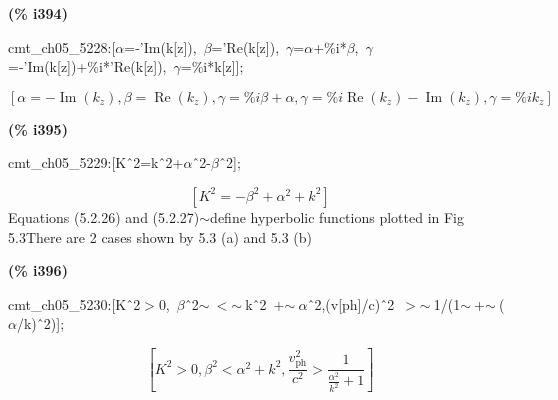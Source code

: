 \documentclass[fleqn]{article}
\begin{document}
\noindent
\begin{minipage}[t]{4.000000em}\color{red}\bfseries
(\% i394)	
\end{minipage}
\begin{minipage}[t]{\textwidth}\color{blue}
cmt\_ch05\_5228:[\ensuremath{\alpha}=-'Im(k[z]),\ \ensuremath{\beta}='Re(k[z]),\ \ensuremath{\gamma}=\ensuremath{\alpha}+\%i*\ensuremath{\beta},\ \ensuremath{\gamma}=-'Im(k[z])+\%i*'Re(k[z]),\ \ensuremath{\gamma}=\%i*k[z]];
\end{minipage}
\[\displaystyle \tag{\% o394} 
\left[ \alpha =-\operatorname{Im}\left( {k_z}\right) \operatorname{,}\beta =\operatorname{Re}\left( {k_z}\right) \operatorname{,}\gamma =\% i \beta +\alpha \operatorname{,}\gamma =\% i \operatorname{Re}\left( {k_z}\right) -\operatorname{Im}\left( {k_z}\right) \operatorname{,}\gamma =\% i {k_z}\right] \mbox{}
\]


\noindent
\begin{minipage}[t]{4.000000em}\color{red}\bfseries
(\% i395)	
\end{minipage}
\begin{minipage}[t]{\textwidth}\color{blue}
cmt\_ch05\_5229:[K\^\ 2=k\^\ 2+\ensuremath{\alpha}\^\ 2-\ensuremath{\beta}\^\ 2];
\end{minipage}
\[\displaystyle \tag{\% o395} 
\left[ {{K}^{2}}=-{{\beta }^{2}}+{{\alpha }^{2}}+{{k}^{2}}\right] \mbox{}
\]
Equations (5.2.26) and (5.2.27)\ensuremath{\sim }define hyperbolic functions plotted in Fig 5.3There are 2 cases shown by 5.3 (a) and 5.3 (b)


\noindent
\begin{minipage}[t]{4.000000em}\color{red}\bfseries
(\% i396)	
\end{minipage}
\begin{minipage}[t]{\textwidth}\color{blue}
cmt\_ch05\_5230:[K\^\ 2\ensuremath{>}0,\ \ensuremath{\beta}\^\ 2\ensuremath{\sim\ }\ensuremath{<}\ensuremath{\sim\ }k\^\ 2\ +\ensuremath{\sim\ }\ensuremath{\alpha}\^\ 2,(v[ph]/c)\^\ 2\ \ensuremath{>}\ensuremath{\sim\ }1/(1\ensuremath{\sim\ }+\ensuremath{\sim\ }(\ensuremath{\alpha}/k)\^\ 2)];
\end{minipage}
\[\displaystyle \tag{\% o396} 
\left[ {{K}^{2}}\operatorname{>  }0\operatorname{,}{{\beta }^{2}}\operatorname{<  }{{\alpha }^{2}}+{{k}^{2}}\operatorname{,}\frac{{{v}_{\ensuremath{\mathrm{ph}}}^{2}}}{{{c}^{2}}}\operatorname{>  }\frac{1}{\frac{{{\alpha }^{2}}}{{{k}^{2}}}+1}\right] \mbox{}
\]
\end{document}
